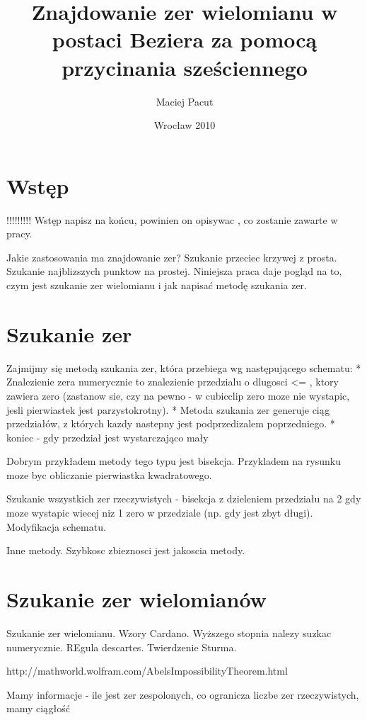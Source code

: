 \documentclass[11pt,a4paper,oneside]{report}
\title{Znajdowanie zer wielomianu w postaci Beziera za pomocą przycinania sześciennego}
\author{Maciej Pacut}
\date{Wrocław 2010}
\begin{document}
\maketitle
\newpage

\section{Wstęp}

!!!!!!!!! Wstęp napisz na końcu, powinien on opisywac , co zostanie zawarte w pracy.

Jakie zastosowania ma znajdowanie zer? Szukanie przeciec krzywej z prosta. Szukanie najblizszych punktow na prostej.
Niniejsza praca daje pogląd na to, czym jest szukanie zer wielomianu i jak napisać metodę szukania zer.

\section{Szukanie zer}

Zajmijmy się metodą szukania zer, która przebiega wg następującego schematu:
* Znalezienie zera numerycznie to znalezienie przedzialu o dlugosci <= \eps, ktory zawiera zero (zastanow sie, czy na pewno - w cubicclip zero moze nie wystapic, jesli pierwiastek jest parzystokrotny).
* Metoda szukania zer generuje ciąg przedziałów, z których kazdy nastepny jest podprzedizalem poprzedniego.
* koniec - gdy przedział jest wystarczająco mały

Dobrym przykładem metody tego typu jest bisekcja. Przykladem na rysunku moze byc obliczanie pierwiastka kwadratowego.

Szukanie wszystkich zer rzeczywistych - bisekcja z dzieleniem przedziału na 2 gdy moze wystapic wiecej niz 1 zero w przedziale (np. gdy jest zbyt długi). Modyfikacja schematu.

Inne metody. Szybkosc zbieznosci jest jakoscia metody. 

\section{Szukanie zer wielomianów}

Szukanie zer wielomianu. Wzory Cardano. Wyższego stopnia nalezy suzkac numerycznie. REgula descartes. Twierdzenie Sturma.

http://mathworld.wolfram.com/AbelsImpossibilityTheorem.html

 Mamy informacje - ile jest zer zespolonych, co ogranicza liczbe zer rzeczywistych, mamy ciągłość
\end{document}
